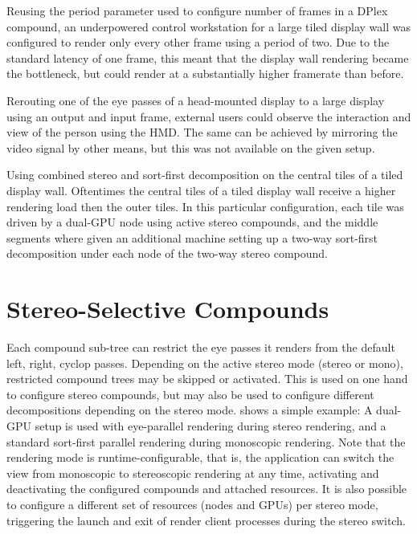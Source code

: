 \begin{compactitem}

\item Reusing the \textsf{period} parameter used to configure number of frames
in a DPlex compound, an underpowered control workstation for a large tiled
display wall was configured to render only every other frame using a period of
two. Due to the standard latency of one frame, this meant that the display wall
rendering became the bottleneck, but could render at a substantially higher
framerate than before.

\item Rerouting one of the eye passes of a head-mounted display to a large
display using an output and input frame, external users could observe the
interaction and view of the person using the HMD. The same can be achieved by
mirroring the video signal by other means, but this was not available on the
given setup.

\item Using combined stereo and sort-first decomposition on the central tiles of
a tiled display wall. Oftentimes the central tiles of a tiled display wall
receive a higher rendering load then the outer tiles. In this particular
configuration, each tile was driven by a dual-GPU node using active stereo
compounds, and the middle segments where given an additional machine setting up
a two-way sort-first decomposition under each node of the two-way stereo
compound.

\end{compactitem}

\section{Stereo-Selective Compounds}

Each compound sub-tree can restrict the eye passes it renders from the default
left, right, cyclop passes. Depending on the active stereo mode (stereo or
mono), restricted compound trees may be skipped or activated. This is used on
one hand to configure stereo compounds, but may also be used to configure
different decompositions depending on the stereo mode.  shows
a simple example: A dual-GPU setup is used with eye-parallel rendering during
stereo rendering, and a standard sort-first parallel rendering during monoscopic
rendering. Note that the rendering mode is runtime-configurable, that is, the
application can switch the view from monoscopic to stereoscopic rendering at any
time, activating and deactivating the configured compounds and attached
resources. It is also possible to configure a different set of resources (nodes
and GPUs) per stereo mode, triggering the launch and exit of render client
processes during the stereo switch.

